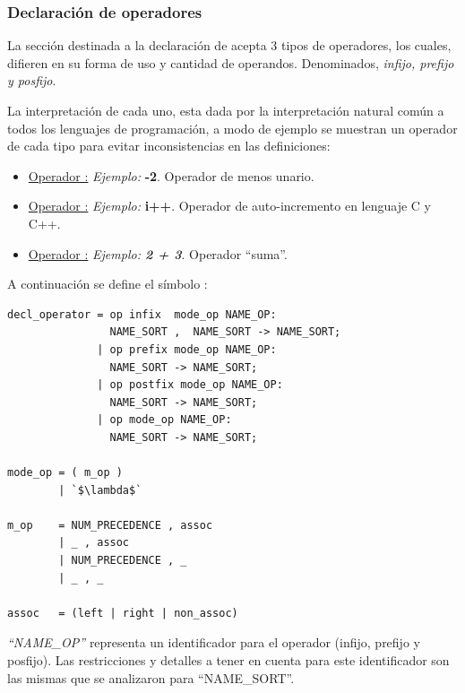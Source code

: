 \subsubsection{Declaración de operadores}
La sección destinada a la declaración de  acepta 3 tipos de operadores, los cuales, difieren en su forma de uso y cantidad de operandos. Denominados, \textit{infijo, prefijo y posfijo}. 

La interpretación de cada uno, esta dada por la interpretación natural común a todos los lenguajes de programación, a modo de ejemplo se muestran un operador de cada tipo para evitar inconsistencias en las definiciones:

\begin{itemize}
\item \underline{Operador :} \textit{Ejemplo:} \textbf{-2}. Operador de menos unario. 

\item \underline{Operador :} \textit{Ejemplo:} \textbf{i++}. Operador de auto-incremento en lenguaje C y C++.

\item \underline{Operador :} \textit{Ejemplo: \textbf{2 + 3}}. Operador ``suma''.
\end{itemize}

A continuación se define el símbolo :

\begin{lstlisting}[frame=shadowbox, language=specmag, linewidth=11cm]
decl_operator = op infix  mode_op NAME_OP:
                NAME_SORT ,  NAME_SORT -> NAME_SORT;
              | op prefix mode_op NAME_OP:
                NAME_SORT -> NAME_SORT;
              | op postfix mode_op NAME_OP:
                NAME_SORT -> NAME_SORT;
              | op mode_op NAME_OP:
                NAME_SORT -> NAME_SORT;

mode_op = ( m_op )
        | `$\lambda$`

m_op    = NUM_PRECEDENCE , assoc
        | _ , assoc
        | NUM_PRECEDENCE , _
        | _ , _

assoc   = (left | right | non_assoc)
\end{lstlisting}

\textit{``NAME\_OP''} representa un identificador para el operador (infijo, prefijo y posfijo). Las restricciones y detalles a tener en cuenta para este identificador son las mismas que se analizaron para ``NAME\_SORT''.

